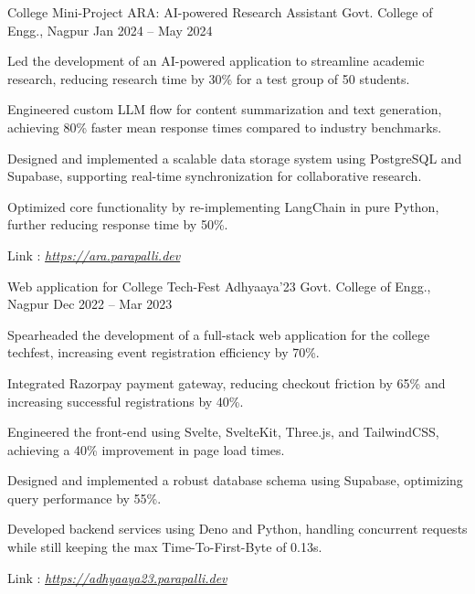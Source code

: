 \documentclass[11pt, a4paper]{awesome-cv}
\begin{document}

\begin{cventries}

\cventry
  {College Mini-Project}
  {ARA: AI-powered Research Assistant}
  {Govt. College of Engg., Nagpur}
  {Jan 2024 -- May 2024}
  {
    \begin{cvitems}
      \item {Led the development of an AI-powered application to streamline academic research, reducing research time by 30\% for a test group of 50 students.}
      \item {Engineered custom LLM flow for content summarization and text generation, achieving 80\% faster mean response times compared to industry benchmarks.}
      \item {Designed and implemented a scalable data storage system using PostgreSQL and Supabase, supporting real-time synchronization for collaborative research.}
      \item {Optimized core functionality by re-implementing LangChain in pure Python, further reducing response time by 50\%.}
      \item {Link : \href{https://ara.parapalli.dev}{\textit{https://ara.parapalli.dev}}}
    \end{cvitems}
  }

  \vskip 0.35cm

\cventry
  {Web application for College Tech-Fest}
  {Adhyaaya'23}
  {Govt. College of Engg., Nagpur}
  {Dec 2022 -- Mar 2023}
  {
    \begin{cvitems}
      \item {Spearheaded the development of a full-stack web application for the college techfest, increasing event registration efficiency by 70\%.}
      \item {Integrated Razorpay payment gateway, reducing checkout friction by 65\% and increasing successful registrations by 40\%.}
      \item {Engineered the front-end using Svelte, SvelteKit, Three.js, and TailwindCSS, achieving a 40\% improvement in page load times.}
      \item {Designed and implemented a robust database schema using Supabase, optimizing query performance by 55\%.}
      \item {Developed backend services using Deno and Python, handling concurrent requests while still keeping the max Time-To-First-Byte of 0.13s.}
      \item {Link : \href{https://adhyaaya23.parapalli.dev}{\textit{https://adhyaaya23.parapalli.dev}}}
    \end{cvitems}
  }


\end{cventries}
\end{document}
